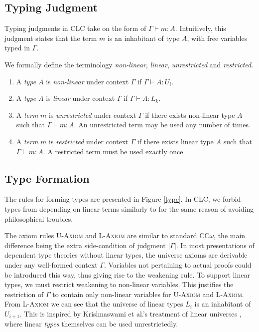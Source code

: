 \documentclass[sigplan,screen,review,anonymous]{acmart}
\newcommand{\rname}[1]{\textsc{\footnotesize #1}}
\newcommand{\pure}[1]{|#1|}
\begin{document}
\subsection{Typing Judgment}
Typing judgments in CLC take on the form of $\Gamma \vdash m : A$. Intuitively, this judgment states that the term $m$ is an inhabitant of type $A$, with free variables typed in $\Gamma$.

\begin{definition} We formally define the terminology \textit{non-linear}, \textit{linear}, \textit{unrestricted} and \textit{restricted}.
  \begin{enumerate}
    \item A \textit{type} $A$ is \textit{non-linear} under context $\Gamma$ if $\Gamma \vdash A : U_i$.
    \item A \textit{type} $A$ is \textit{linear} under context $\Gamma$ if $\Gamma \vdash A : L_k$.
    \item A \textit{term} $m$ is \textit{unrestricted} under context $\Gamma$ if there exists non-linear type $A$ such that $\Gamma \vdash m : A$. An unrestricted term may be used any number of times.
    \item A \textit{term} $m$ is \textit{restricted} under context $\Gamma$ if there exists linear type $A$ such that $\Gamma \vdash m : A$. A restricted term must be used exactly once.
  \end{enumerate}
\end{definition}

\subsection{Type Formation} \label{tyformation}
The rules for forming types are presented in Figure \ref{type}. In CLC, we forbid types from depending on linear terms similarly to \cite{llf,neel15} for the same reason of avoiding philosophical troubles.

The axiom rules \rname{U-Axiom} and \rname{L-Axiom} are similar to standard CC$\omega$, the main difference being the extra side-condition of judgment $\pure{\Gamma}$. In most presentations of dependent type theories without linear types, the universe axioms are derivable under any well-formed context $\Gamma$. Variables not pertaining to actual proofs could be introduced this way, thus giving rise to the weakening rule. To support linear types, we must restrict weakening to non-linear variables. This justifies the restriction of $\Gamma$ to contain only non-linear variables for \rname{U-Axiom} and \rname{L-Axiom}. From \rname{L-Axiom} we can see that the universe of linear types $L_i$ is an inhabitant of $U_{i+1}$. This is inspired by Krishnaswami et al.'s treatment of linear universes \cite{neel15}, where linear \textit{types} themselves can be used unrestrictedly.
\end{document}
